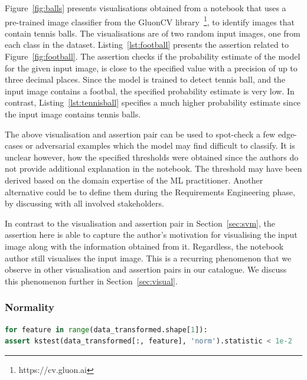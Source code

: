 \documentclass[conference]{IEEEtran}
\begin{document}
Figure~\ref{fig:balls} presents visualisations obtained from a notebook that uses a pre-trained image classifier from the GluonCV library~\footnote{https://cv.gluon.ai}, to identify images that contain tennis balls. The visualisations are of two random input images, one from each class in the dataset. Listing~\ref{lst:football} presents the assertion related to Figure~\ref{fig:football}. The assertion checks if the probability estimate of the model for the given input image, is close to the specified value with a precision of up to three decimal places. Since the model is trained to detect tennis ball, and the input image contains a footbal, the specified probability estimate is very low. In contrast, Listing~\ref{lst:tennisball} specifies a much higher probability estimate since the input image contains tennis balls.

The above visualisation and assertion pair can be used to spot-check a few edge-cases or adversarial examples which the model may find difficult to classify. It is unclear however, how the specified thresholds were obtained since the authors do not provide additional explanation in the notebook. The threshold may have been derived based on the domain expertise of the ML practitioner. Another alternative could be to define them during the Requirements Engineering phase, by discussing with all involved stakeholders\cite{CITEME}.

In contrast to the visualisation and assertion pair in Section~\ref{sec:svm}, the assertion here is able to capture the author's motivation for visualising the input image along with the information obtained from it. Regardless, the notebook author still visualises the input image. This is a recurring phenomenon that we observe in other visualisation and assertion pairs in our catalogue. We discuss this phenomenon further in Section~\ref{sec:visual}.

\subsubsection{Normality}\label{sec:normal}

\begin{lstlisting}[language=Python, caption={Assertion to check that each feature in a dataset is normal. The distribution of each feature is compared to that of a normal distribution using the Kolmogorov-Smirnov test for goodness of fit from the scipy library.}, label={lst:ktest}]
for feature in range(data_transformed.shape[1]):
assert kstest(data_transformed[:, feature], 'norm').statistic < 1e-2
\end{lstlisting}
\end{document}
